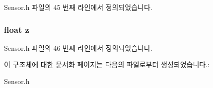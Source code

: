Sensor.\-h 파일의 45 번째 라인에서 정의되었습니다.

\hypertarget{struct__4d__data_af73583b1e980b0aa03f9884812e9fd4d}{
\subsubsection[{z}]{\setlength{\rightskip}{0pt plus 5cm}float z}}\label{struct__4d__data_af73583b1e980b0aa03f9884812e9fd4d}


Sensor.\-h 파일의 46 번째 라인에서 정의되었습니다.



이 구조체에 대한 문서화 페이지는 다음의 파일로부터 생성되었습니다.\-:\begin{DoxyCompactItemize}
\item 
Sensor.\-h\end{DoxyCompactItemize}

